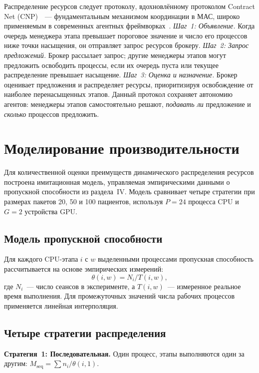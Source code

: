 \documentclass[conference]{IEEEtran}
\begin{document}
Распределение ресурсов следует протоколу, вдохновлённому протоколом Contract Net (CNP)~\cite{smith1980}~--- фундаментальным механизмом координации в МАС, широко применяемым в современных агентных фреймворках~\cite{dorri2018}. \textit{Шаг~1: Объявление.} Когда очередь менеджера этапа превышает пороговое значение и число его процессов ниже точки насыщения, он отправляет запрос ресурсов брокеру. \textit{Шаг~2: Запрос предложений.} Брокер рассылает запрос; другие менеджеры этапов могут предложить освободить процессы, если их очередь пуста или текущее распределение превышает насыщение. \textit{Шаг~3: Оценка и назначение.} Брокер оценивает предложения и распределяет ресурсы, приоритизируя освобождение от наиболее перенасыщенных этапов. Данный протокол сохраняет автономию агентов: менеджеры этапов самостоятельно решают, \textit{подавать ли} предложение и \textit{сколько} процессов предложить.

\section{Моделирование производительности}

Для количественной оценки преимуществ динамического распределения ресурсов построена имитационная модель, управляемая эмпирическими данными о пропускной способности из раздела~IV. Модель сравнивает четыре стратегии при размерах пакетов 20, 50 и 100 пациентов, используя $P = 24$ процесса CPU и $G = 2$ устройства GPU.

\subsection{Модель пропускной способности}

Для каждого CPU-этапа $i$ с $w$ выделенными процессами пропускная способность рассчитывается на основе эмпирических измерений:
\begin{equation}
\theta(i, w) = N_i / T(i, w),
\end{equation}
где $N_i$~--- число сеансов в эксперименте, а $T(i, w)$~--- измеренное реальное время выполнения. Для промежуточных значений числа рабочих процессов применяется линейная интерполяция.

\subsection{Четыре стратегии распределения}

\textbf{Стратегия~1: Последовательная.} Один процесс, этапы выполняются один за другим: $M_{\text{seq}} = \sum n_i / \theta(i, 1)$.
\end{document}
